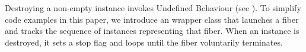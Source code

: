\newpage
{}\label{autocancel}

Destroying a non-empty \fiber instance invokes Undefined Behaviour
(see ). To simplify code examples in this paper, we
introduce an  wrapper class that launches a fiber and tracks
the sequence of \fiber instances representing that fiber. When
an  instance is destroyed, it sets a stop flag and loops until
the fiber voluntarily terminates.

